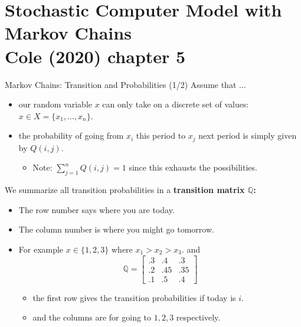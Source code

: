 \documentclass[10pt,c,aspectratio=1610,handout]{beamer}
\begin{document}
\section{Stochastic Computer Model with Markov Chains\\{\small Cole (2020) chapter 5}}%
\begin{frame}{Markov Chains: Transition and Probabilities (1/2)}%
  Assume that ...%
  \begin{itemize}%
    \item[$\blacktriangleright$] our random variable $x$ can only take on a discrete set of values: $x \in X = \{x_1,...,x_n\}$.%
    \item[$\blacktriangleright$] the probability of going from $x_i$ this period to $x_j$ next period is simply given by $Q(i,j)$.%
    \begin{itemize}%
      \item[$\rightarrow$] Note: $\sum_{j=1}^{n} Q(i,j) = 1$ since this exhausts the possibilities.%
    \end{itemize}%
  \end{itemize}%
  \pause%
  We summarize all transition probabilities in a \textbf{transition matrix $\mathbb{Q}$:}%
  \begin{itemize}%
    \item[$\blacktriangleright$] The row number says where you are today.%
    \item[$\blacktriangleright$] The column number is where you might go tomorrow.%
    \pause%
    \item[$\blacktriangleright$] For example $x \in \{1,2,3\}$ where $x_1 > x_2 > x_3$. and \[ \mathbb{Q} = \left [ \begin{array}{ccc} .3 & .4 & .3 \\ .2 & .45 & .35 \\ .1 & .5 & .4 \end{array} \right ] \]%
    \begin{itemize}%
      \item[$\rightarrow$] the first row gives the transition probabilities if today is $i$.%
      \item[$\rightarrow$] and the columns are for going to $1, 2, 3$ respectively.%
    \end{itemize}%
  \end{itemize}%
\end{frame}%
\end{document}
